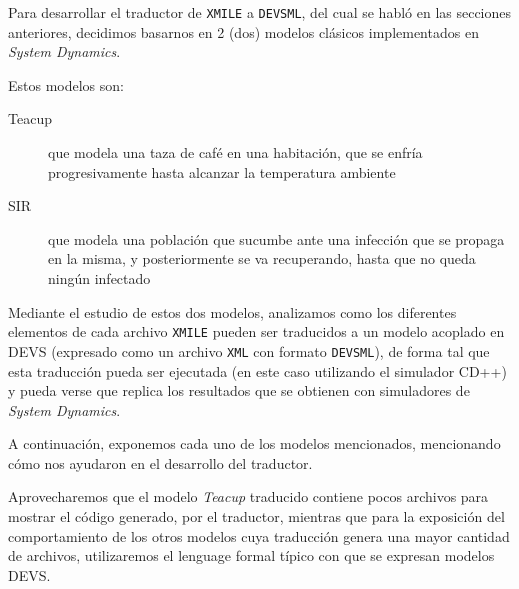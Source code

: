 Para desarrollar el traductor de \texttt{XMILE} a \texttt{DEVSML}, del cual se habló en las secciones anteriores, decidimos basarnos en 2 (dos) modelos clásicos implementados en \textit{System Dynamics}. 

Estos modelos son: 
\begin{description}
	\item[Teacup] que modela una taza de café en una habitación, que se enfría progresivamente hasta alcanzar la temperatura ambiente
	\item[SIR] 	que modela una población que sucumbe ante una infección que se propaga en la misma, y posteriormente se va recuperando, hasta que no queda ningún infectado
\end{description}

Mediante el estudio de estos dos modelos, analizamos como los diferentes elementos de cada archivo \texttt{XMILE} pueden ser traducidos a un modelo acoplado en DEVS (expresado como un archivo \texttt{XML} con formato \texttt{DEVSML}), de forma tal que esta traducción pueda ser ejecutada (en este caso utilizando el simulador CD++) y pueda verse que replica los resultados que se obtienen con simuladores de \textit{System Dynamics}.

A continuación, exponemos cada uno de los modelos mencionados, mencionando cómo nos ayudaron en el desarrollo del traductor. 

Aprovecharemos que el modelo \textit{Teacup} traducido contiene pocos archivos para mostrar el código generado, por el traductor, mientras que para la exposición del comportamiento de los otros modelos cuya traducción genera una mayor cantidad de archivos, utilizaremos el lenguage formal típico con que se expresan modelos DEVS.
